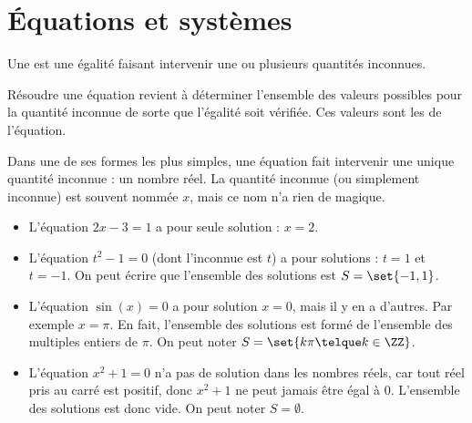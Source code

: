 \documentclass[french,xcolor=svgnames]{beamer}
\begin{document}
\section{Équations et systèmes}
\begin{frame}
\begin{definition}
  Une  est une égalité faisant intervenir une ou plusieurs quantités inconnues.\pause

  Résoudre une équation revient à déterminer l'ensemble des valeurs possibles pour la quantité inconnue de sorte que l'égalité soit vérifiée. Ces valeurs sont les  de l'équation.
\end{definition}

Dans une de ses formes les plus simples, une équation fait intervenir une unique quantité inconnue : un nombre réel. La \og quantité inconnue\fg{} (ou simplement \og inconnue\fg{}) est souvent nommée \(x\), mais ce nom n'a rien de magique.
\end{frame}
\begin{frame}
\begin{example}
  \begin{itemize}[<+->]
  \item L'équation \(2x - 3 = 1\) a pour seule solution : \(x = 2\).
  \item L'équation \(t^{2} - 1 = 0\) (dont l'inconnue est \(t\)) a pour solutions : \(t = 1\) et \(t = -1\). On peut écrire que l'ensemble des solutions est \(S = \set{-1,1}\).
  \item L'équation \(\sin(x) = 0\) a pour solution \(x = 0\), mais il y en a d'autres. \pause Par exemple \(x = \pi\). \pause En fait, l'ensemble des solutions est formé de l'ensemble des multiples entiers de \(\pi\). On peut noter \(S = \set{k \pi \telque k \in \ZZ}\).
  \item L'équation \(x^{2} + 1 = 0\) n'a pas de solution dans les nombres réels, car tout réel pris au carré est positif, donc \(x^{2}+1\) ne peut jamais être égal à \(0\). L'ensemble des solutions est donc vide. On peut noter \(S = \emptyset\).
  \end{itemize}
\end{example}
\end{frame}
\end{document}
